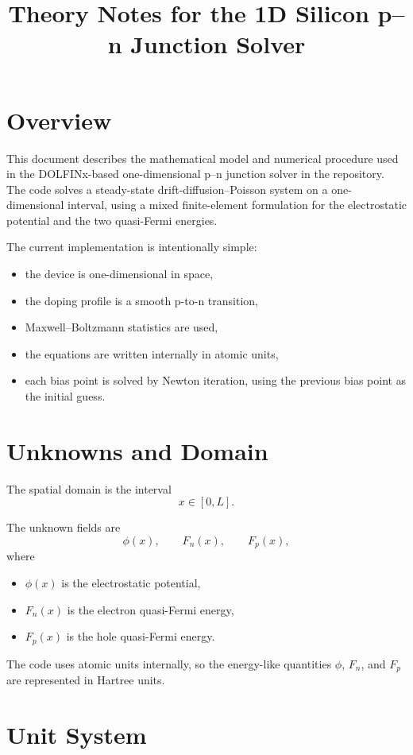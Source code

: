 \documentclass[11pt]{article}
\title{Theory Notes for the 1D Silicon p--n Junction Solver}
\author{}
\date{}
\begin{document}
\maketitle
\tableofcontents
\bigskip

\section{Overview}

This document describes the mathematical model and numerical procedure used in
the DOLFINx-based one-dimensional p--n junction solver in the repository.
The code solves a steady-state drift-diffusion--Poisson system on a one-dimensional
interval, using a mixed finite-element formulation for the electrostatic
potential and the two quasi-Fermi energies.

The current implementation is intentionally simple:
\begin{itemize}
    \item the device is one-dimensional in space,
    \item the doping profile is a smooth p-to-n transition,
    \item Maxwell--Boltzmann statistics are used,
    \item the equations are written internally in atomic units,
    \item each bias point is solved by Newton iteration, using the previous bias
    point as the initial guess.
\end{itemize}

\section{Unknowns and Domain}

The spatial domain is the interval
\[
    x \in [0,L].
\]

The unknown fields are
\[
    \phi(x), \qquad F_n(x), \qquad F_p(x),
\]
where
\begin{itemize}
    \item $\phi(x)$ is the electrostatic potential,
    \item $F_n(x)$ is the electron quasi-Fermi energy,
    \item $F_p(x)$ is the hole quasi-Fermi energy.
\end{itemize}

The code uses atomic units internally, so the energy-like quantities
$\phi$, $F_n$, and $F_p$ are represented in Hartree units.

\section{Unit System}
\end{document}
